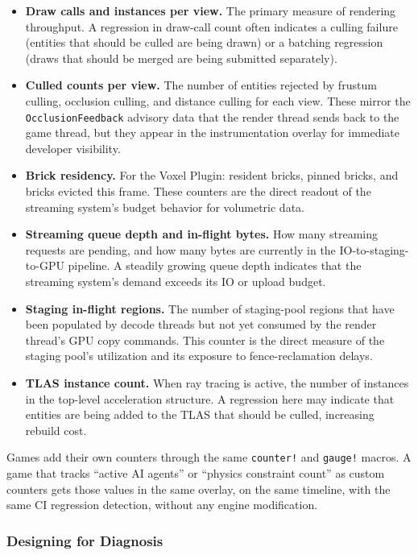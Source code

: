 \documentclass[
  11pt,
  letterpaper,
  DIV=11,
  numbers=noendperiod,
  twoside,
  open=right]{scrreprt}
\providecommand{\tightlist}{%
  \setlength{\itemsep}{0pt}\setlength{\parskip}{0pt}}
\begin{document}
\begin{itemize}
\tightlist
\item
  \textbf{Draw calls and instances per view.} The primary measure of
  rendering throughput. A regression in draw-call count often indicates
  a culling failure (entities that should be culled are being drawn) or
  a batching regression (draws that should be merged are being submitted
  separately).
\item
  \textbf{Culled counts per view.} The number of entities rejected by
  frustum culling, occlusion culling, and distance culling for each
  view. These mirror the \texttt{OcclusionFeedback} advisory data that
  the render thread sends back to the game thread, but they appear in
  the instrumentation overlay for immediate developer visibility.
\item
  \textbf{Brick residency.} For the Voxel Plugin: resident bricks,
  pinned bricks, and bricks evicted this frame. These counters are the
  direct readout of the streaming system's budget behavior for
  volumetric data.
\item
  \textbf{Streaming queue depth and in-flight bytes.} How many streaming
  requests are pending, and how many bytes are currently in the
  IO-to-staging-to-GPU pipeline. A steadily growing queue depth
  indicates that the streaming system's demand exceeds its IO or upload
  budget.
\item
  \textbf{Staging in-flight regions.} The number of staging-pool regions
  that have been populated by decode threads but not yet consumed by the
  render thread's GPU copy commands. This counter is the direct measure
  of the staging pool's utilization and its exposure to
  fence-reclamation delays.
\item
  \textbf{TLAS instance count.} When ray tracing is active, the number
  of instances in the top-level acceleration structure. A regression
  here may indicate that entities are being added to the TLAS that
  should be culled, increasing rebuild cost.
\end{itemize}

Games add their own counters through the same \texttt{counter!} and
\texttt{gauge!} macros. A game that tracks ``active AI agents'' or
``physics constraint count'' as custom counters gets those values in the
same overlay, on the same timeline, with the same CI regression
detection, without any engine modification.

\subsubsection{Designing for Diagnosis}\label{designing-for-diagnosis}
\end{document}
